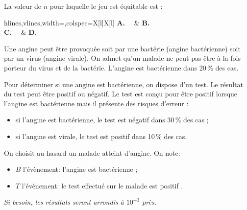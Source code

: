 \documentclass[a4paper,11pt]{article}
\begin{document}
La valeur de $n$ pour laquelle le jeu est équitable est :

\medskip

\begin{tblr}{hlines,vlines,width=\linewidth,colspec={X[l]X[l]}}
	\textbf{A.}~~ & \textbf{B.}~~ \\
	\textbf{C.}~~ & \textbf{D.}~~ \\
\end{tblr}

\pagebreak


\medskip

Une angine peut être provoquée soit par une bactérie (angine bactérienne) soit par un virus (angine virale). On admet qu'un malade ne peut pas être à la fois porteur du virus et de la bactérie. L'angine est bactérienne dans 20\,\% des cas.

Pour déterminer si une angine est bactérienne, on dispose d'un test. Le résultat du test peut être positif ou négatif. Le test est conçu pour être positif lorsque l'angine est bactérienne mais il présente des risques d'erreur :

\begin{itemize}
	\item si l'angine est bactérienne, le test est négatif dans 30\,\% des cas ;
	\item si l'angine est virale, le test est positif dans 10\,\% des cas.
\end{itemize}

On choisit au hasard un malade atteint d'angine. On note:

\begin{itemize}
	\item $B$ l'évènement: \og l'angine est bactérienne \fg{} ;
	\item $T$ l'évènement: \og le test effectué sur le malade est positif \fg. 
\end{itemize}

\textit{Si besoin, les résultats seront arrondis à $10^{-3}$ près.}
\end{document}
